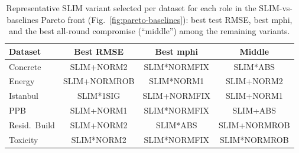 \begin{table}[t]
\centering
\caption{Representative SLIM variant selected per dataset for each role in the SLIM-vs-baselines Pareto front (Fig.~\ref{fig:pareto-baselines}): best test RMSE, best \gls{mphi}, and the best all-round compromise (``middle'') among the remaining variants.}
\label{tab:pareto-baselines-roles}
\begin{tabular}{lccc}
\toprule
Dataset & Best RMSE & Best \gls{mphi} & Middle \\
\midrule
Concrete       & SLIM+NORM2   & SLIM*NORMFIX & SLIM*ABS     \\
Energy         & SLIM+NORMROB & SLIM*NORM1   & SLIM+NORM2   \\
Istanbul       & SLIM*1SIG    & SLIM+NORMFIX & SLIM+NORM1   \\
PPB            & SLIM+NORM1   & SLIM*NORMFIX & SLIM+ABS     \\
Resid.\ Build  & SLIM+NORM2   & SLIM*ABS     & SLIM+NORMROB \\
Toxicity       & SLIM*NORM2   & SLIM*NORMFIX & SLIM*NORMROB \\
\bottomrule
\end{tabular}
\end{table}
